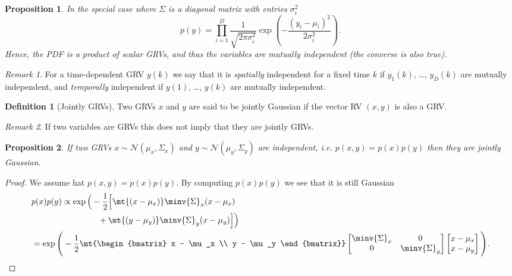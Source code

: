 \documentclass[margin=small]{hsrzf}
\theoremstyle{plain}
\newtheorem{prop}{Proposition}[section]
\theoremstyle{definition}
\newtheorem{defn}{Definition}[section]
\theoremstyle{remark}
\newtheorem*{remark}{Remark}
\begin{document}
\begin{prop}
  In the special case where $\Sigma$ is a diagonal matrix with entries
  $\sigma^2_i$
  \[
    p(y) = \prod_{i=1}^D \frac{1}{\sqrt{2\pi \sigma^2_i}}
      \exp\left(-\frac{(y_i - \mu_i)^2}{2\sigma^2_i}\right).
  \]
  Hence, the PDF is a product of scalar GRVs, and thus the variables are
  mutually independent (the converse is also true).
\end{prop}

\begin{remark}
  For a time-dependent GRV $y(k)$ we say that it is \emph{spatially}
  independent for a fixed time $k$ if $y_1(k)$, \dots, $y_D(k)$ are
  mutually independent, and \emph{temporally} independent if $y(1)$, \dots,
  $y(k)$ are mutually independent.
\end{remark}

\begin{defn}[Jointly GRVs]
  Two GRVs $x$ and $y$ are said to be jointly Gaussian if the vector RV $(x,
  y)$ is also a GRV.
\end{defn}

\begin{remark}
  If two variables are GRVs this does not imply that they are jointly GRVs.
\end{remark}

\begin{prop} \label{lem:independent-grvs-joint}
  If two GRVs $x \sim \mathcal{N}(\mu_x, \Sigma_x)$ and $y \sim
  \mathcal{N}(\mu_y, \Sigma_y)$ are independent, i.e. $p(x,y) = p(x)p(y)$
  then they are jointly Gaussian.
\end{prop}
\begin{proof}
  We assume hat $p(x, y) = p(x)p(y)$. By computing $p(x)p(y)$ we see that it
  is still Gaussian
  \begin{align*}
    &p(x)p(y)
    \propto \exp \Big(
      -\frac{1}{2} \Big[
        \mt{(x - \mu_x)} \minv{\Sigma}_x (x - \mu_x) \\
        &\qquad\qquad\qquad\qquad
          + \mt{(y - \mu_y)} \minv{\Sigma}_y (x - \mu_y)
      \Big]
    \Big) \\
    &= \exp \Bigg(
      -\frac{1}{2} \mt{\begin{bmatrix}
        x - \mu_x \\
        y - \mu_y 
      \end{bmatrix}}
      \begin{bmatrix}
        \minv{\Sigma}_x & 0 \\
        0 & \minv{\Sigma}_y
      \end{bmatrix}
      \begin{bmatrix}
        x - \mu_x \\
        x - \mu_y
      \end{bmatrix}
    \Bigg).
    \qedhere
  \end{align*}
\end{proof}
\end{document}
